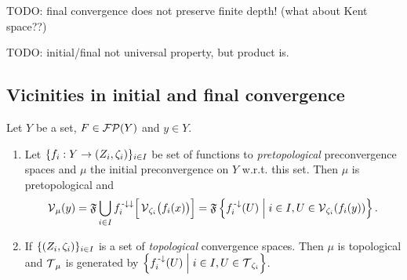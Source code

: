 TODO: final convergence does not preserve finite depth! (what about Kent space??)

TODO: initial/final not universal property, but product is.

\subsection{Vicinities in initial and final convergence}
\begin{proposition} \label{pretopologicalInitialConvergence}
Let $Y$ be a set, $F\in \operatorname{\mathcal{FP}}(Y)$ and $y\in Y$.
\begin{enumerate}
\item Let $\{f_i: Y\to \left( Z_i, \zeta_i \right)\}_{i\in I}$ be set of functions to \emph{pretopological} preconvergence spaces and $\mu$ the initial preconvergence on $Y$ w.r.t. this set. Then $\mu$ is pretopological and
\[ \operatorname{\mathcal{V}}_\mu(y) = \mathfrak{F}\bigcup_{i\in I} f_i^{{\text{\hspace{0.15em}-}\downarrow}\downarrow}\Big[\operatorname{\mathcal{V}}_{\zeta_i}\!\big(f_i(x)\big)\Big] = \mathfrak{F}\left\{ f_i^{\text{\hspace{0.15em}-}\downarrow}(U) \;\middle|\; i\in I, U\in \operatorname{\mathcal{V}}_{\zeta_i}(f_i(y)) \right\}. \]
\item If $\{\left( Z_i, \zeta_i \right)\}_{i\in I}$ is a set of \emph{topological} convergence spaces. Then $\mu$ is topological and $\operatorname{\mathcal{T}}_\mu$ is generated by $\left\{ f_i^{\text{\hspace{0.15em}-}\downarrow}(U) \;\middle|\; i\in I, U\in \operatorname{\mathcal{T}}_{\zeta_i} \right\}$.
\end{enumerate}
\end{proposition}

